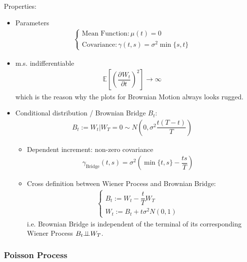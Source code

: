 Properties:
\begin{itemize}[topsep=2pt,itemsep=0pt]
        \item Parameters
        \begin{align}
            \begin{cases}
                \text{Mean Function}:\mu (t)=0\\
                \text{Covariance}:\gamma (t,s)=\sigma ^2 \min\{s,t\} 
            \end{cases} 
        \end{align}
        \item m.s. indifferentiable
        \begin{align}
            \mathbb{E}\left[ \left(\dfrac{\partial^{} W_t}{\partial t^{}}\right)^2 \right]\to \infty  
        \end{align}
        which is the reason why the plots for Brownian Motion always looks rugged.
        \item Conditional distribution / Brownian Bridge $ B_t $:
        \begin{align}
            B_t := W_t|W_T=0 \sim N(0,\sigma ^2\dfrac{t(T-t)}{T})
        \end{align}
        \begin{itemize}[topsep=2pt,itemsep=0pt]
            \item Dependent increment: non-zero covariance
        \begin{align}
            \gamma_\mathrm{Bridge}  (t,s) = \sigma ^2\left(\min\{t,s\}-\dfrac{ts}{T}\right)
        \end{align}
            \item Cross definition between Wiener Process and Brownian Bridge:
            \begin{align}
                \begin{cases}
                    B_t:=W_t-\dfrac{t}{T}W_T\\
                    W_t:=B_t+t \sigma ^2 N(0,1) 
                \end{cases}
            \end{align}
            i.e. Brownian Bridge is independent of the terminal of its corresponding Wiener Process $ B_t\bot\!\!\!\bot W_T $.
        \end{itemize}
\end{itemize}

\subsubsection{Poisson Process}
\hypertarget{PoissonProcess}{}

